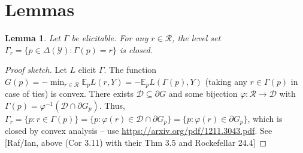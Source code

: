 \documentclass[12pt]{article}
\newcommand{\D}{\mathcal{D}}
\newcommand{\E}{\mathbb{E}}
\newcommand{\R}{\mathcal{R}}
\newcommand{\Y}{\mathcal{Y}}
\newtheorem{lemma}{Lemma}
\begin{document}
\section{Lemmas}

\begin{lemma}\label{lem:closed-level-sets}
	Let $\Gamma$ be elicitable.
	For any $r\in\R$, the level set $\Gamma_r = \{ p \in \Delta(\Y) : \Gamma(p) = r \}$ is closed.
\end{lemma}
\begin{proof}[Proof sketch]
	Let $L$ elicit $\Gamma$.
	The function $G(p) = -\min_{r\in\R} \E_p L(r,Y) = -\E_p L(\Gamma(p),Y)$ (taking any $r\in\Gamma(p)$ in case of ties) is convex.
	There exists $\D \subseteq \partial G$ and some bijection $\varphi : \R \to \D$ with $\Gamma(p) = \varphi^{-1}(\D\cap \partial G_p)$.
	Thus, $\Gamma_r = \{p : r\in\Gamma(p)\} = \{p : \varphi(r) \in \D\cap\partial G_p\} = \{p : \varphi(r) \in \partial G_p\}$, which is closed by convex analysis -- use \url{https://arxiv.org/pdf/1211.3043.pdf}.
	See [Raf/Ian, above (Cor 3.11) with their Thm 3.5 and Rockefellar 24.4]  
\end{proof}
\end{document}
